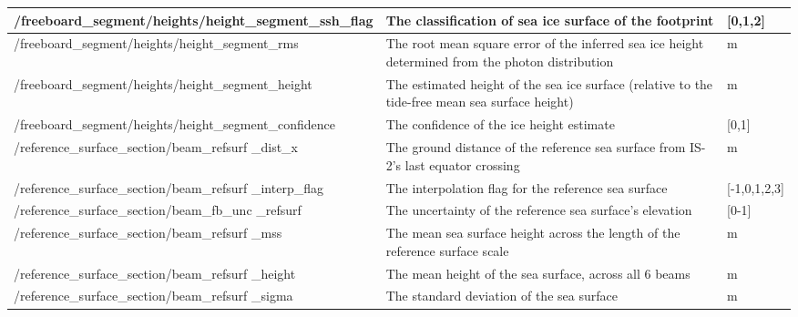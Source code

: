 \begin{table}[htbp]
\begin{adjustwidth}{-4em}{-4em}
\begin{tabularx}{1.33\textwidth} {|X|X|l|}
   \hline
   /freeboard\_segment/heights/\newline \indent height\_segment\_ssh\_flag & The classification of sea ice surface of the footprint & [0,1,2]\\ 
   \hline
   /freeboard\_segment/heights/\newline \indent height\_segment\_rms & The root mean square error of the inferred sea ice height determined from the photon distribution & m\\ 
   \hline
   /freeboard\_segment/heights/\newline \indent height\_segment\_height & The estimated height of the sea ice surface (relative to the tide-free mean sea surface height) & m\\ 
   \hline
   /freeboard\_segment/heights/\newline \indent height\_segment\_confidence & The confidence of the ice height estimate & [0,1]\\
\hhline{|=|=|=|}
   /reference\_surface\_section/beam\_refsurf \newline \indent\_dist\_x & The ground distance of the reference sea surface from IS-2's last equator crossing & m\\ 
   \hline
   /reference\_surface\_section/beam\_refsurf \newline \indent\_interp\_flag & The interpolation flag for the reference sea surface & [-1,0,1,2,3]\\ 
   \hline
   /reference\_surface\_section/beam\_fb\_unc \newline \indent\_refsurf & The uncertainty of the reference sea surface's elevation & [0-1]\\ 
   \hline
   /reference\_surface\_section/beam\_refsurf \newline \indent\_mss & The mean sea surface height across the length of the reference surface scale & m\\ 
   \hline
   /reference\_surface\_section/beam\_refsurf \newline \indent\_height & The mean height of the sea surface, across all 6 beams & m\\ 
   \hline
   /reference\_surface\_section/beam\_refsurf \newline \indent\_sigma & The standard deviation of the sea surface & m\\ 
   \hline
  \end{tabularx}
   \end{adjustwidth}
\end{table}
